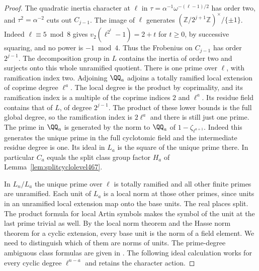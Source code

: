 \documentclass[a4paper,11pt]{article}
\theoremstyle{definition}
\theoremstyle{remark}
\newcommand{\ZZ}{\mathbb Z}\newcommand{\ord}{\operatorname{ord}}
\numberwithin{equation}{section}
\begin{document}
\begin{proof}
The quadratic inertia character at \(\ell\) in
\(\tau=\alpha^{-1}\omega^{-(\ell-1)/2}\) has order two, and
\(\tau^2=\alpha^{-2}\) cuts out \(C_{j-1}\). The image of
\(\ell\) generates \((\ZZ/2^{j+1}\ZZ)^\times/\{\pm1\}\).
Indeed \(\ell\equiv5\bmod8\) gives
\(v_2(\ell^{2^t}-1)=2+t\) for \(t\ge0\), by successive
squaring, and no power is \(-1\bmod4\). Thus the Frobenius
on \(C_{j-1}\) has order \(2^{j-1}\). The decomposition group
in \(L\) contains the inertia of order two and surjects onto
this whole unramified quotient. There is one prime over
\(\ell\), with ramification index two. Adjoining \(\QQ_a\)
adjoins a totally ramified local extension of coprime degree
\(\ell^a\). The local degree is the product by coprimality,
and its ramification index is a multiple of the coprime
indices \(2\) and \(\ell^a\). Its residue field contains that
of \(L\), of degree \(2^{j-1}\). The product of these lower
bounds is the full global degree, so the ramification index
is \(2\ell^a\) and there is still just one prime.
The prime in \(\QQ_a\) is generated
by the norm to \(\QQ_a\) of \(1-\zeta_{\ell^{a+1}}\). Indeed
this generates the unique prime in the full cyclotomic field
and the intermediate residue degree is one. Its ideal in
\(L_a\) is the square of the unique prime there. In particular
\(C_a\) equals the split class group factor \(H_a\) of
Lemma~\ref{lem:splitcyclolevel467}.

In \(L_n/L_a\) the unique prime over \(\ell\) is totally
ramified and all other finite primes are unramified. Each unit
of \(L_a\) is a local norm at those other primes, since units
in an unramified local extension map onto the base units.
The real places split. The product formula for local Artin
symbols makes the symbol of the unit at the last prime trivial
as well. By the local norm theorem and the Hasse norm theorem
for a cyclic extension, every base unit is the norm of a field
element. We need to distinguish which of them are norms of
units. The prime-degree ambiguous class formulas are given in
\cite{XI-VIII-ambiguous505}. The following ideal calculation works for
every cyclic degree \(\ell^{n-a}\) and retains the character action.


\end{proof}
\end{document}
